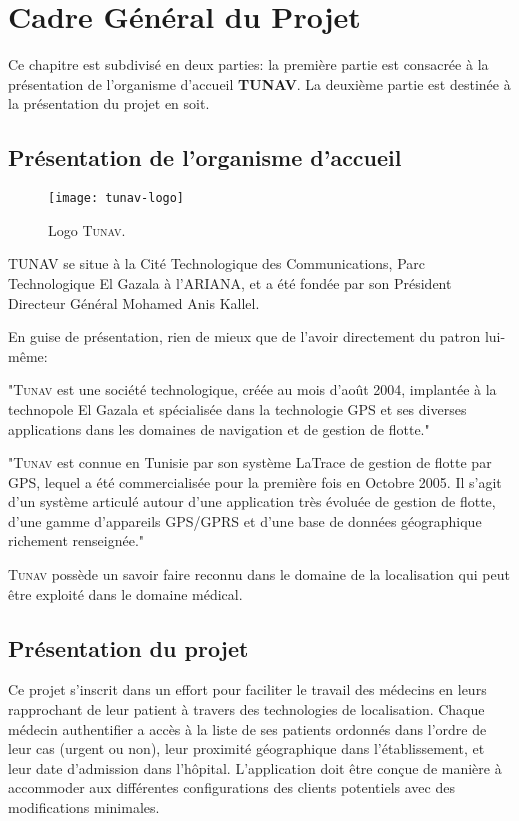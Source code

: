 
\chapter{Cadre Général du Projet}


Ce chapitre est subdivisé en deux parties: la première partie est
consacrée à la présentation de l’organisme d’accueil \textbf{TUNAV}. La
deuxième partie est destinée à la présentation du projet en soit.

\section{Présentation de l'organisme d'accueil}  

\begin{figure}
\center
\texttt{[image: tunav-logo]}
\caption{Logo \textsc{Tunav}.}
\end{figure}

TUNAV se situe à la Cité Technologique des Communications, Parc
Technologique El Gazala à l’ARIANA, et a été fondée par son Président
Directeur Général Mohamed Anis Kallel.

En guise de présentation, rien de mieux que de l’avoir directement du patron lui-même\cite{index_tunisie}:

"\textsc{Tunav} est une société technologique, créée au mois d’août
2004, implantée à la technopole El Gazala et spécialisée dans la
technologie GPS et ses diverses applications dans les domaines de
navigation et de gestion de flotte."

"\textsc{Tunav} est connue en Tunisie par son système \og{}LaTrace\fg{}
de gestion de flotte par GPS, lequel a été commercialisée pour la
première fois en Octobre 2005. Il s'agit d'un système articulé autour
d'une application très évoluée de gestion de flotte, d'une gamme
d'appareils GPS/GPRS et d'une base de données géographique richement
renseignée."

\textsc{Tunav} possède un savoir faire reconnu dans le domaine de la
localisation qui peut être exploité dans le domaine médical.

\section{Présentation du projet}

Ce projet s'inscrit dans un effort pour faciliter le travail des médecins en
leurs rapprochant de leur patient à travers des technologies de localisation.
Chaque médecin authentifier a accès à la liste de ses patients ordonnés dans
l'ordre de leur cas (urgent ou non), leur proximité géographique dans
l’établissement, et leur date d’admission dans l'hôpital. L'application doit
être conçue de manière à accommoder aux différentes configurations des clients
potentiels avec des modifications minimales.

